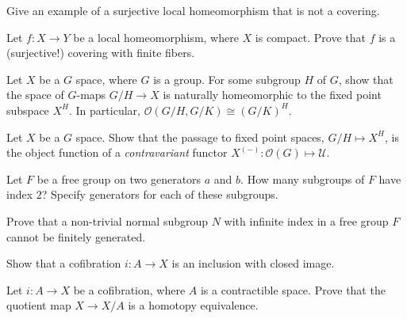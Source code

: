 \begin{problem}{3.3}
  Give an example of a surjective local homeomorphism that is not a covering.
\end{problem}

\begin{problem}{3.4}
  Let $f : X \to Y$ be a local homeomorphism, where $X$ is compact. Prove that $f$ is a (surjective!) covering with finite fibers.
\end{problem}

\begin{problem}{3.5}
  Let $X$ be a $G$ space, where $G$ is a group. For some subgroup $H$ of $G$, show that the space of $G$-maps $G/H \to X$ is naturally homeomorphic to the fixed point subspace $X^H$. In particular, $\mathscr{O}(G/H, G/K)\cong (G/K)^H$.
\end{problem}

\begin{problem}{3.6}
  Let $X$ be a $G$ space. Show that the passage to fixed point spaces, $G/H \mapsto X^H$, is the object function of a \emph{contravariant} functor $X^{(-)} : \mathscr{O}(G) \mapsto \mathscr{U}$.
\end{problem}

\begin{problem}{4.1}
  Let $F$ be a free group on two generators $a$ and $b$. How many subgroups of $F$ have index $2$? Specify generators for each of these subgroups.
\end{problem}

\begin{problem}{4.2}
  Prove that a non-trivial normal subgroup $N$ with infinite index in a free group $F$ cannot be finitely generated.
\end{problem}

\begin{problem}{6.1}
  Show that a cofibration $i : A \to X$ is an inclusion with closed image.
\end{problem}

\begin{problem}{6.2}
  Let $i : A \to X$ be a cofibration, where $A$ is a contractible space. Prove that the quotient map $X \to X /A$ is a homotopy equivalence.
\end{problem}

